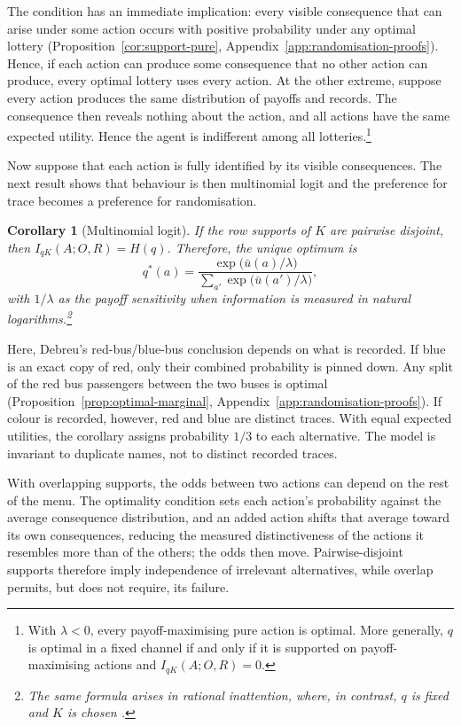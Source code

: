\documentclass[11pt,a4paper]{article}
\newtheorem{corollary}[theorem]{Corollary}
\theoremstyle{definition}
\newcommand{\I}{I}
\newcommand{\Sh}{H}
\newcommand{\1}{\mathbf 1}
\begin{document}
The condition has an immediate implication: every visible consequence that can arise under some action
occurs with positive probability under any optimal lottery (Proposition~\ref{cor:support-pure},
Appendix~\ref{app:randomisation-proofs}).  Hence, if each action can produce some consequence that no other action can produce, every optimal lottery uses every action. At the other extreme, suppose every action produces the same distribution of payoffs and records. The consequence then reveals nothing about the action, and all actions have the same expected utility. Hence the agent is indifferent among all lotteries.\footnote{With $\lambda<0$, every payoff-maximising pure action is optimal.  More generally, $q$ is optimal in a fixed channel if and only if it is supported on payoff-maximising actions and $\I_{qK}(A;O,R)=0$.}


Now suppose that each action is fully identified by its visible consequences.  The next result shows that behaviour is then multinomial logit and the preference for trace becomes a preference for randomisation. 

\begin{corollary}[Multinomial logit]\label{rem:logit}
If the row supports of $K$ are pairwise disjoint, then $\I_{qK}(A;O,R)=\Sh(q)$.  Therefore, the unique optimum is
\[
 q^*(a)
 =\frac{\exp\bigl(\bar u(a)/\lambda\bigr)}
 {\sum_{a'}\exp\bigl(\bar u(a')/\lambda\bigr)},
\]
with $1/\lambda$ as the payoff sensitivity when information is measured in natural logarithms.\footnote{The same formula arises in rational inattention, where, in contrast, $q$ is fixed and $K$ is chosen \cite{MatejkaMcKay2015}.}
\end{corollary}

Here, Debreu's red-bus/blue-bus conclusion depends on what is recorded.  If blue is an exact copy of red, only their combined probability is pinned down. Any split of the red bus passengers between the two buses is optimal (Proposition~\ref{prop:optimal-marginal}, Appendix~\ref{app:randomisation-proofs}).  If colour is recorded, however, red and blue are distinct traces.  With equal expected utilities, the corollary assigns probability $1/3$ to each alternative.  The model is invariant to duplicate names, not to distinct recorded traces.


With overlapping supports, the odds between two actions can depend on the rest of the menu.  The optimality
condition sets each action's probability against the average consequence distribution, and an added action
shifts that average toward its own consequences, reducing the measured distinctiveness of the actions it
resembles more than of the others; the odds then move.  Pairwise-disjoint supports therefore imply independence
of irrelevant alternatives, while overlap permits, but does not require, its failure.
\end{document}
